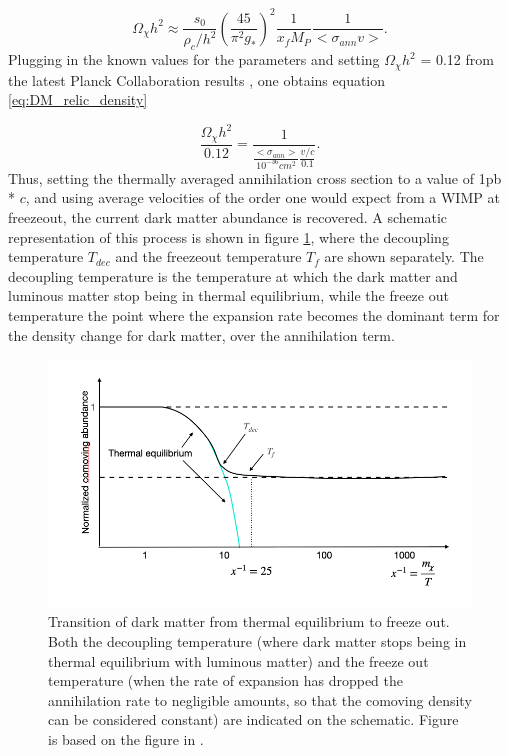 \begin{equation}
    \label{eq:sol_Boltzmann}
    \Omega_\chi h^2 \approx \frac{s_0}{\rho_c/h^2} \left( \frac{45}{\pi^2g_*}\right)^2 \frac{1}{x_f M_P} \frac{1}{<\sigma_{ann}v>}.
\end{equation}
Plugging in the known values for the parameters \cite{ref 533 DM review} and setting $\Omega_\chi h^2$ = 0.12 from the latest Planck Collaboration results \cite{Planck2020}, one obtains equation \ref{eq:DM_relic_density}

\begin{equation}
    \label{eq:DM_relic_density}
    \frac{\Omega_\chi h^2}{0.12} = \frac{1}{\frac{<\sigma_{ann}>}{10^{-36} cm^2} \frac{v/c}{0.1}}.
\end{equation}
Thus, setting the thermally averaged annihilation cross section to a value of 1pb * $c$, and using average velocities of the order one would expect from a WIMP at freezeout, the current dark matter abundance is recovered. A schematic representation of this process is shown in figure \ref{fig:DM_thremal_eq_freeze_out}, where the decoupling temperature $T_{dec}$ and the freezeout temperature $T_{f}$ are shown separately. The decoupling temperature is the temperature at which the dark matter and luminous matter stop being in thermal equilibrium, while the freeze out temperature the point where the expansion rate becomes the dominant term for the density change for dark matter, over the annihilation term. 

\begin{figure}[h!]
    \centering
    \includegraphics[width=\textwidth]{figures/schematic_thermal_eq_evolution_DM.png}
    \caption{Transition of dark matter from thermal equilibrium to freeze out. Both the decoupling temperature (where dark matter stops being in thermal equilibrium with luminous matter) and the freeze out temperature (when the rate of expansion has dropped the annihilation rate to negligible amounts, so that the comoving density can be considered constant) are indicated on the schematic. Figure is based on the figure in \cite{Baer}.}
    \label{fig:DM_thremal_eq_freeze_out}
\end{figure}



